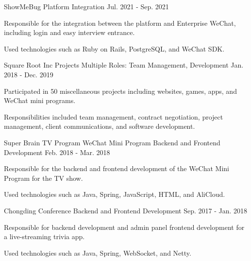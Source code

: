 \begin{cventries}
  \cventry
    {ShowMeBug} %
    {Platform Integration} %
    {} %
    {Jul. 2021 - Sep. 2021} %
    {
      \begin{cvitems} %
        \item {Responsible for the integration between the platform and Enterprise WeChat, including login and easy interview entrance.}
        \item {Used technologies such as Ruby on Rails, PostgreSQL, and WeChat SDK.}
      \end{cvitems}
    }

  \cventry
    {Square Root Inc Projects} %
    {Multiple Roles: Team Management, Development} %
    {} %
    {Jan. 2018 - Dec. 2019} %
    {
      \begin{cvitems} %
        \item {Participated in 50 miscellaneous projects including websites, games, apps, and WeChat mini programs.}
        \item {Responsibilities included team management, contract negotiation, project management, client communications, and software development.}
      \end{cvitems}
    }

  \cventry
    {Super Brain TV Program WeChat Mini Program} %
    {Backend and Frontend Development} %
    {} %
    {Feb. 2018 - Mar. 2018} %
    {
      \begin{cvitems} %
        \item {Responsible for the backend and frontend development of the WeChat Mini Program for the TV show.}
        \item {Used technologies such as Java, Spring, JavaScript, HTML, and AliCloud.}
      \end{cvitems}
    }

  \cventry
    {Chongding Conference} %
    {Backend and Frontend Development} %
    {} %
    {Sep. 2017 - Jan. 2018} %
    {
      \begin{cvitems} %
        \item {Responsible for backend development and admin panel frontend development for a live-streaming trivia app.}
        \item {Used technologies such as Java, Spring, WebSocket, and Netty.}
      \end{cvitems}
    }


\end{cventries}

